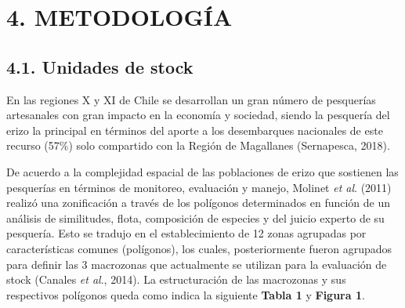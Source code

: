 \documentclass[
]{article}
\begin{document}
\pagebreak

\hypertarget{metodologuxeda}{%
\section{4. METODOLOGÍA}\label{metodologuxeda}}

\hypertarget{unidades-de-stock}{%
\subsection{4.1. Unidades de stock}\label{unidades-de-stock}}

En las regiones X y XI de Chile se desarrollan un gran número de
pesquerías artesanales con gran impacto en la economía y sociedad,
siendo la pesquería del erizo la principal en términos del aporte a los
desembarques nacionales de este recurso (57\%) solo compartido con la
Región de Magallanes (Sernapesca, 2018).

De acuerdo a la complejidad espacial de las poblaciones de erizo que
sostienen las pesquerías en términos de monitoreo, evaluación y manejo,
Molinet \emph{et al}. (2011) realizó una zonificación a través de los
polígonos determinados en función de un análisis de similitudes, flota,
composición de especies y del juicio experto de su pesquería. Esto se
tradujo en el establecimiento de 12 zonas agrupadas por características
comunes (polígonos), los cuales, posteriormente fueron agrupados para
definir las 3 macrozonas que actualmente se utilizan para la evaluación
de stock (Canales \emph{et al}., 2014). La estructuración de las
macrozonas y sus respectivos polígonos queda como indica la siguiente
\textbf{Tabla 1} y \textbf{Figura 1}.
\end{document}
